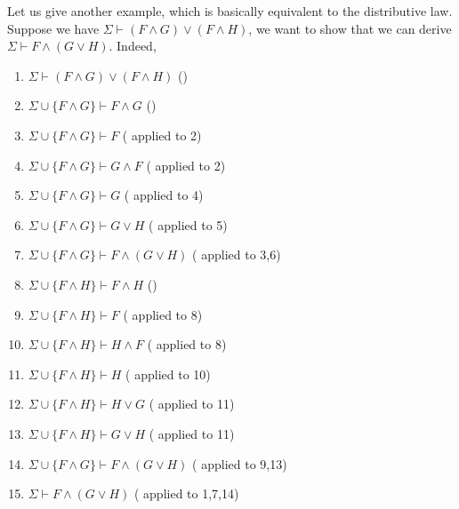 \begin{prooftree}
\end{prooftree}

Let us give another example, which is basically equivalent to the distributive law. Suppose we have $\Sigma\vdash (F\wedge G)\vee(F\wedge H)$, we want to show that we can derive $\Sigma\vdash F\wedge(G\vee H)$. Indeed,
\begin{enumerate}
    \item $\Sigma\vdash (F\wedge G)\vee(F\wedge H)$ \hfill ()%
    
    \item $\Sigma\cup\{F\wedge G\} \vdash F\wedge G$ \hfill ()%
    \item $\Sigma\cup\{F\wedge G\} \vdash F$ \hfill ( applied to 2)%
    \item $\Sigma\cup\{F\wedge G\} \vdash G\wedge F$ \hfill ( applied to 2)%
    \item $\Sigma\cup\{F\wedge G\} \vdash G$ \hfill ( applied to 4)%
    \item $\Sigma\cup\{F\wedge G\}\vdash G\vee H$ \hfill ( applied to 5)%
    \item $\Sigma\cup\{F\wedge G\}\vdash F\wedge(G\vee H)$ \hfill ( applied to 3,6)%

    \item $\Sigma\cup\{F\wedge H\} \vdash F\wedge H$ \hfill ()%
    \item $\Sigma\cup\{F\wedge H\} \vdash F$ \hfill ( applied to 8)%
    \item $\Sigma\cup\{F\wedge H\} \vdash H\wedge F$ \hfill ( applied to 8)%
    \item $\Sigma\cup\{F\wedge H\} \vdash H$ \hfill ( applied to 10)%
    \item $\Sigma\cup\{F\wedge H\}\vdash H\vee G$ \hfill ( applied to 11)%
    \item $\Sigma\cup\{F\wedge H\}\vdash G\vee H$ \hfill ( applied to 11)%
    \item $\Sigma\cup\{F\wedge G\}\vdash F\wedge(G\vee H)$ \hfill ( applied to 9,13)%

    \item $\Sigma\vdash F\wedge(G\vee H)$ \hfill ( applied to 1,7,14)%
\end{enumerate}

